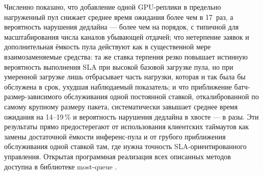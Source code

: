 \documentclass[12pt,a4paper]{article}
\newcommand{\articlesection}[1]{\par\vspace{14pt}{\bfseries #1}\par\vspace{6pt}\nopagebreak}
\begin{document}
Численно показано, что добавление одной GPU-реплики в предельно нагруженный пул снижает среднее время ожидания более чем в 17~раз, а вероятность нарушения дедлайна --- более чем на порядок, с типичной для масштабирования числа каналов убывающей отдачей; что нетерпение заявок и дополнительная ёмкость пула действуют как в существенной мере взаимозаменяемые средства: та же ставка терпения резко повышает истинную вероятность выполнения SLA при высокой базовой загрузке пула, но при умеренной загрузке лишь отбрасывает часть нагрузки, которая и так была бы обслужена в срок, ухудшая наблюдаемый показатель; и что приближение батч-размер-зависимого обслуживания одной постоянной ставкой, откалиброванной по самому крупному размеру пакета, систематически завышает среднее время ожидания на 14--19\,\% и вероятность нарушения дедлайна в хвосте --- в разы. Эти результаты прямо предостерегают от использования клиентских таймаутов как замены достаточной ёмкости инференс-пула и от грубого приближения обслуживания одной ставкой там, где нужна точность SLA-ориентированного управления. Открытая программная реализация всех описанных методов доступна в библиотеке most-queue \cite{mostqueue2026}.

\articlesection{Список литературы}
\printbibliography[heading=none]
\end{document}
